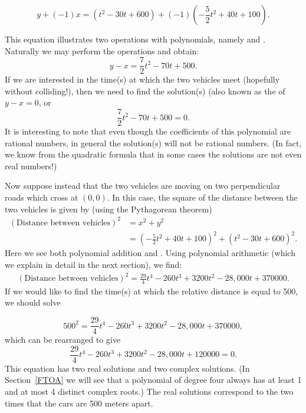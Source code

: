 $$ y + (-1)x =  (t^2- 30t + 600) + (-1)(-\frac{5}{2} t^2+ 40t + 100).$$

This equation illustrates two operations with polynomials, namely  and .  Naturally we may perform the operations and obtain:
$$ y -x =  \frac{7}{2} t^2- 70t + 500.$$
If we are interested in the time(s) at which the two vehicles meet (hopefully without colliding!), then we need to find the solution(s) (also known as the  of  $y-x = 0$, or
$$   \frac{7}{2} t^2 - 70t + 500 = 0.$$
It is interesting to note that even though the coefficients of this polynomial are rational numbers, in general the solution(s) will not be rational numbers. (In fact, we know from the quadratic formula that in some cases the solutions are not even real numbers!)

Now suppose instead that the two vehicles are moving on two perpendicular roads which cross at $(0,0)$.  In this case, the square of the distance between the two vehicles is given by (using the Pythagorean theorem)
\begin{align*}
(\text{Distance between vehicles})^2 &= x^2 + y^2 \\
&= (-\frac{5}{2} t^2+ 40t + 100)^2 + (t^2- 30t + 600)^2.
\end{align*}
Here we see both polynomial addition and . Using polynomial arithmetic (which we explain in detail in the next section), we find:
\begin{align*}
(\text{Distance between vehicles})^2 = \frac{29}{4}t^4 - 260t^3+3200t^2-28,000t+370000.
\end{align*}
If we would like to find the time(s) at which the relative distance is equal to 500, we should solve

$$500^2 = \frac{29}{4}t^4 - 260t^3+3200t^2-28,000t+370000, $$
which can be rearranged to give
$$ \frac{29}{4}t^4 - 260t^3+3200t^2-28,000t+120000=0.$$
This equation has two real solutions and two complex solutions. (In Section~\ref{FTOA} we will see that a  polynomial of degree four always has at least 1 and at most 4 distinct complex roots.) The real solutions correspond to the two times that the cars are 500 meters apart. 
  
